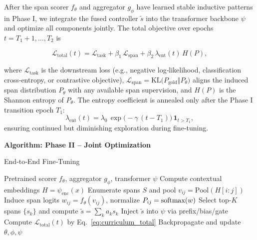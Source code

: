 After the span scorer \(f_\theta\) and aggregator \(g_\phi\) have learned stable inductive patterns in Phase I, we integrate the fused controller \(\tilde{s}\) into the transformer backbone \(\psi\) and optimize all components jointly.  The total objective over epochs \(t=T_1+1,\dots,T_2\) is

\begin{equation}
	\mathcal{L}_{\mathrm{total}}(t)
	= \mathcal{L}_{\mathrm{task}}
	+ \beta_{1}\,\mathcal{L}_{\mathrm{span}}
	+ \beta_{2}\,\lambda_{\mathrm{ent}}(t)\,H(P),
	\label{eq:curriculum_total}
\end{equation}

where
\(\mathcal{L}_{\mathrm{task}}\) is the downstream loss (e.g., negative log‐likelihood, classification cross‐entropy, or contrastive objective),  
\(\mathcal{L}_{\mathrm{span}} = \mathrm{KL}\bigl(P_{\mathrm{gold}}\Vert P_{\theta}\bigr)\) aligns the induced span distribution \(P_\theta\) with any available span supervision, and  
\(H(P)\) is the Shannon entropy of \(P_\theta\).  
The entropy coefficient is annealed only after the Phase I transition epoch \(T_1\):
\[
\lambda_{\mathrm{ent}}(t)
= \lambda_{0}\,\exp\bigl(-\gamma\,(t - T_1)\bigr)\,\mathbf{1}_{t > T_1},
\label{eq:entropy_schedule}
\]
ensuring continued but diminishing exploration during fine‐tuning.

\medskip
\noindent\textbf{Algorithm: Phase II – Joint Optimization}

\begin{algorithm}[H]
	\caption{End‐to‐End Fine‐Tuning}
	\label{alg:e2e_finetuning}
	\begin{algorithmic}[1]
		\REQUIRE Pretrained scorer \(f_\theta\), aggregator \(g_\phi\), transformer \(\psi\)
		\STATE Compute contextual embeddings \(H = \psi_{\mathrm{enc}}(x)\)
		\STATE Enumerate spans \(S\) and pool \(v_{ij} = \mathrm{Pool}(H[i:j])\)
		\STATE Induce span logits \(w_{ij}=f_\theta(v_{ij})\), normalize 
		\(P_{ij}=\mathrm{softmax}(w)\)
		\STATE Select top-\(K\) spans \(\{s_k\}\) and compute \(\tilde{s}=\sum_k a_k s_k\)
		\STATE Inject \(\tilde{s}\) into \(\psi\) via prefix/bias/gate
		\STATE Compute \(\mathcal{L}_{\mathrm{total}}(t)\) by Eq.~\eqref{eq:curriculum_total}
		\STATE Backpropagate and update \(\theta,\phi,\psi\)
		\ENDFOR
		\ENDFOR
	\end{algorithmic}
\end{algorithm}

